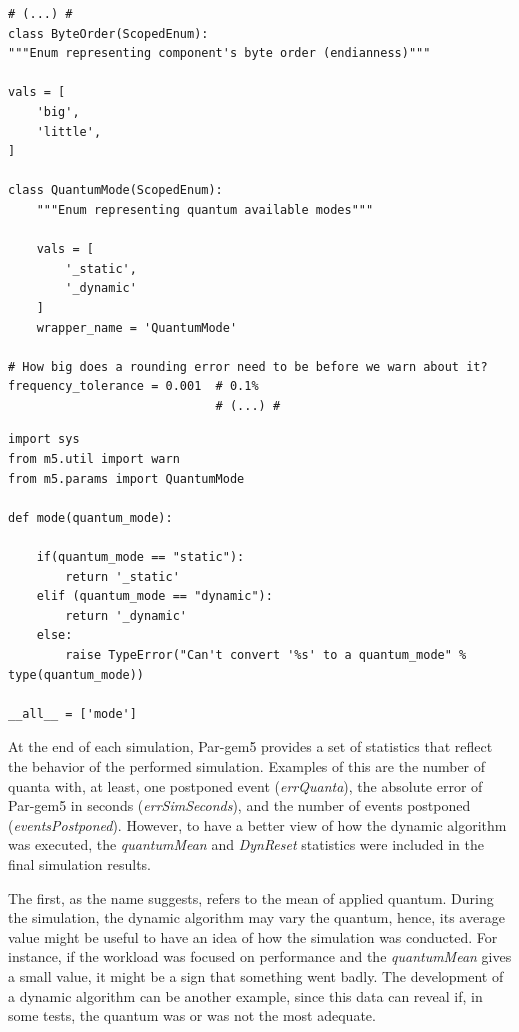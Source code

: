 \newpage

\begin{lstlisting}[style=customPython, caption={Snippet of Params.py}, label=SnippetParams]
                             # (...) #
class ByteOrder(ScopedEnum):
"""Enum representing component's byte order (endianness)"""

vals = [
    'big',
    'little',
]

class QuantumMode(ScopedEnum):  
    """Enum representing quantum available modes"""

    vals = [
        '_static',
        '_dynamic'
    ]
    wrapper_name = 'QuantumMode'

# How big does a rounding error need to be before we warn about it?
frequency_tolerance = 0.001  # 0.1%
                             # (...) #
\end{lstlisting}

\begin{lstlisting}[style=customPython, caption={Quantum.py file}, label=SnippetQuantum]
import sys
from m5.util import warn
from m5.params import QuantumMode

def mode(quantum_mode):

    if(quantum_mode == "static"):
        return '_static'
    elif (quantum_mode == "dynamic"):
        return '_dynamic'
    else:
        raise TypeError("Can't convert '%s' to a quantum_mode" % type(quantum_mode))

__all__ = ['mode']
\end{lstlisting}


At the end of each simulation, Par-gem5 provides a set of statistics that reflect the behavior of the performed simulation. Examples of this are 
the number of quanta with, at least, one postponed event (\textit{errQuanta}), the absolute error of Par-gem5 in seconds (\textit{errSimSeconds}), 
and the number of events postponed (\textit{eventsPostponed}). However, to have a better view of how the dynamic algorithm was executed, 
the \textit{quantumMean} \space and \textit{DynReset} \space statistics were included in the final simulation results. 

The first, as the name suggests, refers to the mean of applied quantum. During the simulation, the dynamic algorithm may vary the quantum, 
hence, its average value might be useful to have an idea of how the simulation was conducted. For instance, if the workload was 
focused on performance and the \textit{quantumMean} gives a small value, it might be a sign that something went badly. The development of a 
dynamic algorithm can be another example, since this data can reveal if, in some tests, the quantum was or was not the most adequate.

